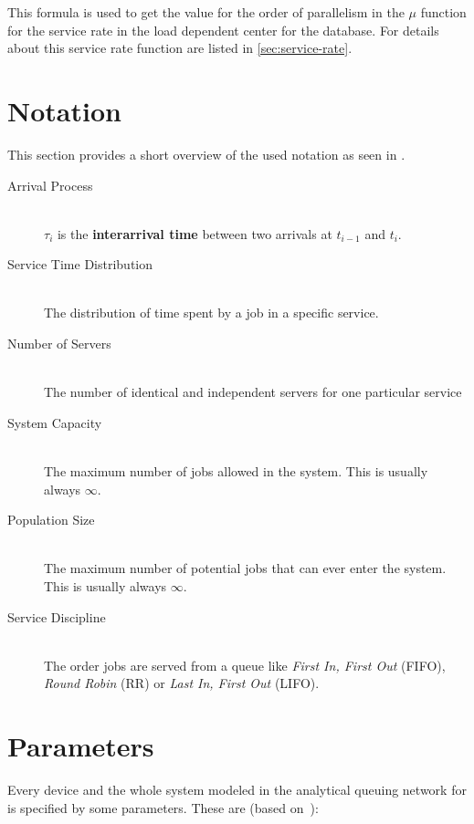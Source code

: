 \documentclass[a4paper, oneside]{csthesis}
\begin{document}
    This formula is used to get the value for the order of parallelism in the
    $\mu$ function for the service rate in the load dependent center for the
    database.
    For details about this service rate function are
    listed in \cref{sec:service-rate}.
    
\section{Notation}

    This section provides a short overview of the used notation as seen in
    \cite{jain2008art}.

    \begin{description}
    \item[Arrival Process] \ \\ 
      $\tau_i$ is the {\bf interarrival time} between two arrivals at $t_{i-1}$
      and $t_{i}$.
    \item[Service Time Distribution] \ \\
      The distribution of time spent by a job in a specific service.
    \item[Number of Servers] \ \\
      The number of identical and independent servers for one particular service
    \item[System Capacity] \ \\
      The maximum number of jobs allowed in the system. This is usually always
      $\infty$.
    \item[Population Size] \ \\
      The maximum number of potential jobs that can ever enter the system. This
      is usually always $\infty$.
    \item[Service Discipline] \ \\
      The order jobs are served from a queue like {\it First In, First Out}
      (FIFO), {\it Round Robin} (RR) or {\it Last In, First Out} (LIFO).
    \end{description}

\section{Parameters}
\label{sc:parameters}

    Every device and the whole system modeled in the analytical queuing network
    for \telesto{} is specified by some parameters. These are (based
    on~\cite{jain2008art}):
    
\end{document}
